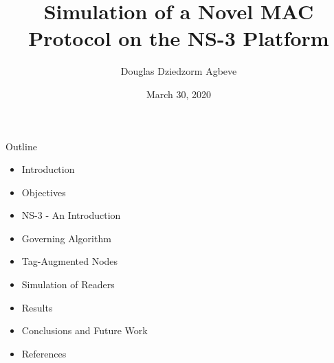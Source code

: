 \documentclass [xcolor=svgnames, t] {beamer}
\title[APT-MAC Sim. in NS-3 (MSc. Thesis)]{Simulation of a Novel MAC Protocol on the NS-3 Platform}
\institute[]{Computer Science \\University of Rome, \\La Sapienza. }
\author[Agbeve, Douglas]{
Douglas Dziedzorm Agbeve
}
\date{March 30, 2020}
\begin{document}
\begin{frame}
 \titlepage   
\end{frame}









\begin{frame}{Outline}
\vspace{1cm}
\begin{center}
   \begin{itemize}
     \item Introduction
     \item Objectives
     \item NS-3 - An Introduction
     \item Governing Algorithm
     \item Tag-Augmented Nodes
     \item Simulation of Readers
     \item Results
     \item Conclusions and Future Work
     \item References
 \end{itemize} 
\end{center}
 
\end{frame}
\end{document}
